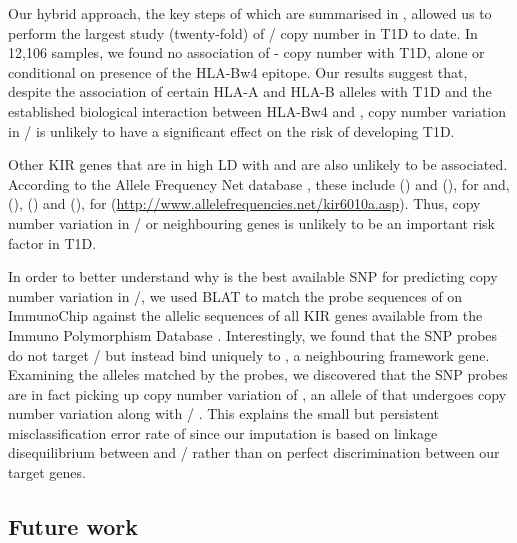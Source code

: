 Our hybrid approach, the key steps of which are summarised in , allowed us to perform the largest study (twenty-fold)
of / copy number in T1D to date.
In 12,106 samples, we found no association of - copy number with T1D, alone or conditional on presence of the HLA-Bw4 epitope.
Our results suggest that, despite the association of certain HLA-A and HLA-B alleles with T1D and the established biological interaction between HLA-Bw4 and ,
copy number variation in / is unlikely to have a significant effect on the risk of developing T1D.

Other KIR genes that are in high \gls{LD} with  and  are also unlikely to be associated. 
According to the Allele Frequency Net database \citep{GonzalezGalarza:2011gm}, these include  () and  (),
for  and,  (),  () and  (), for 
(\url{http://www.allelefrequencies.net/kir6010a.asp}).
Thus, copy number variation in / or neighbouring genes is unlikely to be an important risk factor in T1D.

In order to better understand why  is the best available SNP for predicting copy number variation in /, we used BLAT \citep{Kent:2002jd}
to match the probe sequences of  on ImmunoChip against the allelic sequences of all KIR genes available from the Immuno Polymorphism Database \citep{Robinson:2010dy}.
Interestingly, we found that the SNP probes do not target / but instead bind uniquely to , a neighbouring framework gene.
Examining the  alleles matched by the  probes, we discovered that the SNP probes are in fact picking up copy number variation of ,
an allele of  that undergoes copy number variation along with / \citep{GomezLozano:2005hz}.  
This explains the small but persistent misclassification error rate of  since our imputation is based on linkage disequilibrium between  and / rather than on perfect discrimination between our target genes.

\subsection{Future work}


